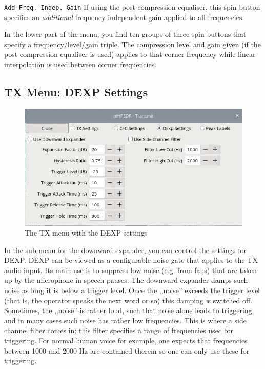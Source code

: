 \documentclass[12pt]{book}
\def\rett#1{\texttt{\color{red}#1}}
\begin{document}
\rett{Add Freq.-Indep. Gain} If using the post-compression equaliser, this spin button specifies an
\textit{additional} frequency-independent gain applied to all frequencies.

In the lower part of the menu, you find ten groups of three spin buttons that specify a frequency/level/gain
triple. The compression level and gain given (if the post-compression equaliser is used) applies to that
corner frequency while linear interpolation is used between corner frequencies.

\subsection{TX Menu: DEXP Settings}

\begin{figure}[ht]
\center
\includegraphics[width=12cm]{TX_DEXP.png}
\caption{The TX menu with the DEXP settings}
\label{fig:DEXPmenu}
\end{figure}

In the sub-menu for the downward expander, you can control the settings for DEXP. DEXP can be viewed
as a configurable noise gate that applies to the TX audio input. Its main use is to suppress low noise
(e.g. from fans) that are taken up  by the microphone in speech pauses. The downward expander damps
such noise as long it is below a trigger level. Once the ,,noise'' exceeds the trigger level (that is,
the  operator speaks the next word or so) this damping is switched off. Sometimes, the ,,noise'' is
rather loud, such that noise alone leads to triggering, and in many cases such noise has rather low
frequencies. This is where a side channel filter comes in: this filter specifies a range of frequencies
used for triggering. For normal human voice for example, one expects that frequencies between 1000 and
2000 Hz are contained therein so one can only use these for triggering.
\end{document}
